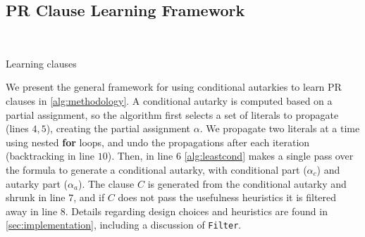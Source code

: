 
\subsection{PR Clause Learning Framework}~\label{subsec:methodology}

\begin{algorithm}\caption{Learning \pr clauses}\label{alg:methodology}
    \SetAlgoNoLine
\end{algorithm}

We present the general framework for using conditional autarkies to learn PR
clauses in \autoref{alg:methodology}. A conditional autarky is computed based on
a partial assignment, so the algorithm first selects a set of literals to
propagate (lines $4,5$), creating the partial assignment $\alpha$. We propagate
two literals at a time using nested \textbf{for} loops, and undo the
propagations after each iteration (backtracking in line $10$). Then, in line $6$
\autoref{alg:leastcond} makes a single pass over the formula to generate a
conditional autarky, with conditional part ($\alpha_c$) and autarky part
($\alpha_a$). The \pr clause $C$ is generated from the conditional autarky and
shrunk in line $7$, and if $C$ does not pass the usefulness heuristics it is
filtered away in line $8$. Details regarding design choices and heuristics are
found in \autoref{sec:implementation}, including a discussion of
\texttt{Filter}.

